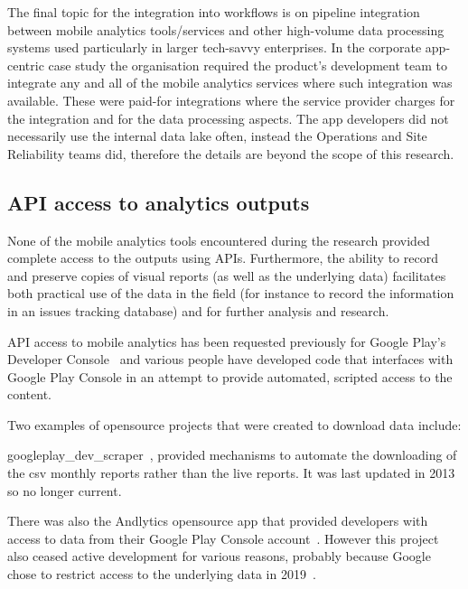 The final topic for the integration into workflows is on pipeline integration between mobile analytics tools/services and other high-volume data processing systems used particularly in larger tech-savvy enterprises. In the corporate app-centric case study the organisation required the product's development team to integrate any and all of the mobile analytics services where such integration was available. These were paid-for integrations where the service provider charges for the integration and for the data processing aspects. The app developers did not necessarily use the internal data lake often, instead the Operations and Site Reliability teams did, therefore the details are beyond the scope of this research.

\subsection{API access to analytics outputs}
None of the mobile analytics tools encountered during the research provided complete access to the outputs using APIs. Furthermore, the ability to record and preserve copies of visual reports (as well as the underlying data) facilitates both practical use of the data in the field (for instance to record the information in an issues tracking database) and for further analysis and research. 

API access to mobile analytics has been requested previously for Google Play's Developer Console~ and various people have developed code that interfaces with Google Play Console in an attempt to provide automated, scripted access to the content.

\begin{kaobox}[frametitle=Opensource projects to download data from Google Play Console]
Two examples of opensource projects that were created to download data include:

googleplay\_dev\_scraper~, provided mechanisms to automate the downloading of the \Gls{csv} monthly reports rather than the live reports. It was last updated in 2013 so no longer current. 

There was also the Andlytics opensource app that provided developers with access to data from their Google Play Console account~. 
However this project also ceased active development for various reasons, probably because Google chose to restrict access to the underlying data in 2019~. %
\end{kaobox}

